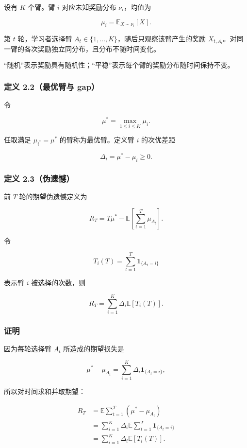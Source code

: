 \documentclass[
  11pt,
  a4paper,
]{ctexart}
\begin{document}
设有 \(K\) 个臂。臂 \(i\) 对应未知奖励分布 \(\nu_i\)，均值为

\[
\mu_i=\mathbb E_{X\sim\nu_i}[X].
\]

第 \(t\) 轮，学习者选择臂
\(A_t\in\{1,\ldots,K\}\)，随后只观察该臂产生的奖励
\(X_{t,A_t}\)。对同一臂的各次奖励独立同分布，且分布不随时间变化。

``随机''表示奖励具有随机性；``平稳''表示每个臂的奖励分布随时间保持不变。

\subsubsection{定义 2.2（最优臂与
gap）}\label{ux5b9aux4e49-2.2ux6700ux4f18ux81c2ux4e0e-gap}

令

\[
\mu^*=\max_{1\le i\le K}\mu_i.
\]

任取满足 \(\mu_{i^*}=\mu^*\) 的臂称为最优臂。定义臂 \(i\) 的次优差距

\[
\Delta_i=\mu^*-\mu_i\ge0.
\]

\subsubsection{定义
2.3（伪遗憾）}\label{ux5b9aux4e49-2.3ux4f2aux9057ux61be}

前 \(T\) 轮的期望伪遗憾定义为

\[
R_T=T\mu^*-\mathbb E\left[\sum_{t=1}^T\mu_{A_t}\right].
\]

令

\[
T_i(T)=\sum_{t=1}^T\mathbf1_{\{A_t=i\}}
\]

表示臂 \(i\) 被选择的次数，则

\[
R_T=\sum_{i=1}^K\Delta_i\mathbb E[T_i(T)].
\]

\subsubsection{证明}\label{ux8bc1ux660e-4}

因为每轮选择臂 \(A_t\) 所造成的期望损失是

\[
\mu^*-\mu_{A_t}=\sum_{i=1}^K\Delta_i\mathbf1_{\{A_t=i\}},
\]

所以对时间求和并取期望：

\[
\begin{aligned}
R_T
&=\mathbb E\sum_{t=1}^T(\mu^*-\mu_{A_t})\\
&=\sum_{i=1}^K\Delta_i\mathbb E\sum_{t=1}^T\mathbf1_{\{A_t=i\}}\\
&=\sum_{i=1}^K\Delta_i\mathbb E[T_i(T)].
\end{aligned}
\]
\end{document}
